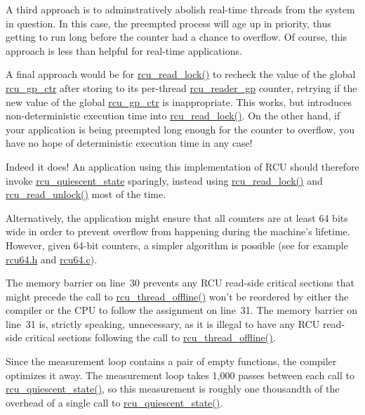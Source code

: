 	A third approach is to adminstratively abolish real-time threads
	from the system in question.
	In this case, the preempted process will age up in priority,
	thus getting to run long before the counter had a chance to
	overflow.
	Of course, this approach is less than helpful for real-time
	applications.

	A final approach would be for \url{rcu_read_lock()} to recheck
	the value of the global \url{rcu_gp_ctr} after storing to its
	per-thread \url{rcu_reader_gp} counter, retrying if the new
	value of the global \url{rcu_gp_ctr} is inappropriate.
	This works, but introduces non-deterministic execution time
	into \url{rcu_read_lock()}.
	On the other hand, if your application is being preempted long
	enough for the counter to overflow, you have no hope of
	deterministic execution time in any case!


	Indeed it does!
	An application using this implementation of RCU should therefore
	invoke \url{rcu_quiescent_state} sparingly, instead using
	\url{rcu_read_lock()} and \url{rcu_read_unlock()} most of the
	time.

	Alternatively, the application might ensure that all counters
	are at least 64 bits wide in order to prevent overflow from
	happening during the machine's lifetime.
	However, given 64-bit counters, a simpler algorithm is possible
	(see for example \url{rcu64.h} and \url{rcu64.c}).


	The memory barrier on line~30 prevents any RCU read-side
	critical sections that might precede the
	call to \url{rcu_thread_offline()} won't be reordered by either
	the compiler or the CPU to follow the assignment on line~31.
	The memory barrier on line~31 is, strictly speaking, unnecessary,
	as it is illegal to have any RCU read-side critical sections
	following the call to \url{rcu_thread_offline()}.


	Since the measurement loop contains a pair of empty functions,
	the compiler optimizes it away.
	The measurement loop takes 1,000 passes between each call to
	\url{rcu_quiescent_state()}, so this measurement is roughly
	one thousandth of the overhead of a single call to
	\url{rcu_quiescent_state()}.

